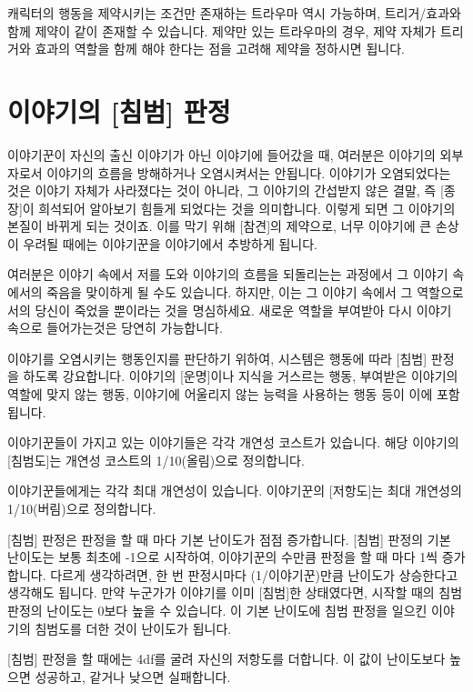 \documentclass[12pt]{report}
\newcommand{\world}[1]{{\nanumpen \large #1 \par}\bigskip}
\begin{document}
	캐릭터의 행동을 제약시키는 조건만 존재하는 트라우마 역시 가능하며, 트리거/효과와 함께 제약이 같이 존재할 수 있습니다. 제약만 있는 트라우마의 경우, 제약 자체가 트리거와 효과의 역할을 함께 해야 한다는 점을 고려해 제약을 정하시면 됩니다.
	
	
	\chapter{이야기의 [침범] 판정}\label{침범_판정}
	\world{이야기꾼이 자신의 출신 이야기가 아닌 이야기에 들어갔을 때, 여러분은 이야기의 외부자로서 이야기의 흐름을 방해하거나 오염시켜서는 안됩니다. 이야기가 오염되었다는 것은 이야기 자체가 사라졌다는 것이 아니라, 그 이야기의 간섭받지 않은 결말, 즉 [종장]이 희석되어 알아보기 힘들게 되었다는 것을 의미합니다. 이렇게 되면 그 이야기의 본질이 바뀌게 되는 것이죠. 이를 막기 위해 [참견]의 제약으로, 너무 이야기에 큰 손상이 우려될 때에는 이야기꾼을 이야기에서 추방하게 됩니다.}
	\world{여러분은 이야기 속에서 저를 도와 이야기의 흐름을 되돌리는는 과정에서 그 이야기 속에서의 죽음을 맞이하게 될 수도 있습니다. 하지만, 이는 그 이야기 속에서 그 역할으로서의 당신이 죽었을 뿐이라는 것을 명심하세요. 새로운 역할을 부여받아 다시 이야기 속으로 들어가는것은 당연히 가능합니다.}
	
	이야기를 오염시키는 행동인지를 판단하기 위하여, 시스템은 행동에 따라 [침범] 판정을 하도록 강요합니다. 이야기의 [운명]이나 지식을 거스르는 행동, 부여받은 이야기의 역할에 맞지 않는 행동, 이야기에 어울리지 않는 능력을 사용하는 행동 등이 이에 포함됩니다.
	
	이야기꾼들이 가지고 있는 이야기들은 각각 개연성 코스트가 있습니다. 해당 이야기의 [침범도]는 개연성 코스트의 1/10(올림)으로 정의합니다.
	
	이야기꾼들에게는 각각 최대 개연성이 있습니다. 이야기꾼의 [저항도]는 최대 개연성의 1/10(버림)으로 정의합니다.
	
	\bigskip
	
	[침범] 판정은 판정을 할 때 마다 기본 난이도가 점점 증가합니다. [침범] 판정의 기본 난이도는 보통 최초에 -1으로 시작하여, 이야기꾼의 수만큼 판정을 할 때 마다 1씩 증가합니다. 다르게 생각하려면, 한 번 판정시마다 (1/이야기꾼)만큼 난이도가 상승한다고 생각해도 됩니다. 만약 누군가가 이야기를 이미 [침범]한 상태였다면, 시작할 때의 침범 판정의 난이도는 0보다 높을 수 있습니다. 이 기본 난이도에 침범 판정을 일으킨 이야기의 침범도를 더한 것이 난이도가 됩니다.
	
	[침범] 판정을 할 때에는 4df를 굴려 자신의 저항도를 더합니다. 이 값이 난이도보다 높으면 성공하고, 같거나 낮으면 실패합니다.
	
\end{document}
